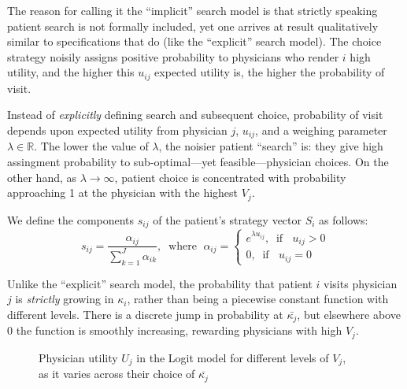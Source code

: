 \documentclass[../main.tex]{subfiles}
\begin{document}
The reason for calling it the ``implicit'' search model is that strictly speaking patient search is not formally included, yet one arrives at result qualitatively similar to specifications that do (like the ``explicit'' search model). The choice strategy noisily assigns positive probability to physicians who render $i$ high utility, and the higher this $u_{ij}$ expected utility is, the higher the probability of visit.

Instead of \textit{explicitly} defining search and subsequent choice, probability of visit depends upon expected utility from physician $j$, $u_{ij}$, and a weighing parameter $\lambda \in \mathbb{R}$. The lower the value of $\lambda$, the noisier patient ``search'' is: they give high assingment probability to sub-optimal—yet feasible—physician choices. On the other hand, as $\lambda \rightarrow \infty$, patient choice is concentrated with probability approaching 1 at the physician with the highest $V_j$.

We define the components $s_{ij}$ of the patient's strategy vector $S_i$ as follows:
\begin{equation}
s_{ij} = \frac{\alpha_{ij}}{\sum_{k = 1}^{J} \alpha_{ik}}, \; \; \text{where } \; \alpha_{ij} = \begin{cases}
e^{\lambda u_{ij}}, \; \; \text{if } \; \; u_{ij} > 0 \\
0 , \; \; \text{if } \; \; u_{ij} = 0
\end{cases}
\label{eq:Logit_s}
\end{equation}

Unlike the ``explicit'' search model, the probability that patient $i$ visits physician $j$ is \textit{strictly} growing in $\kappa_i$, rather than being a piecewise constant function with different levels. There is a discrete jump in probability at $\bar{\kappa_j}$, but elsewhere above $0$ the function is smoothly increasing, rewarding physicians with high $V_j$.

\vspace{0.7em}

\begin{figure}[H]
\centering
\begin{tikzpicture}[scale=0.6]

\end{tikzpicture}
\caption{Physician utility $U_j$ in the Logit model for different levels of $V_j$,\\ as it varies across their choice of $\bar{\kappa_j}$}
\label{fig:LogitUj}
\end{figure}
\end{document}
